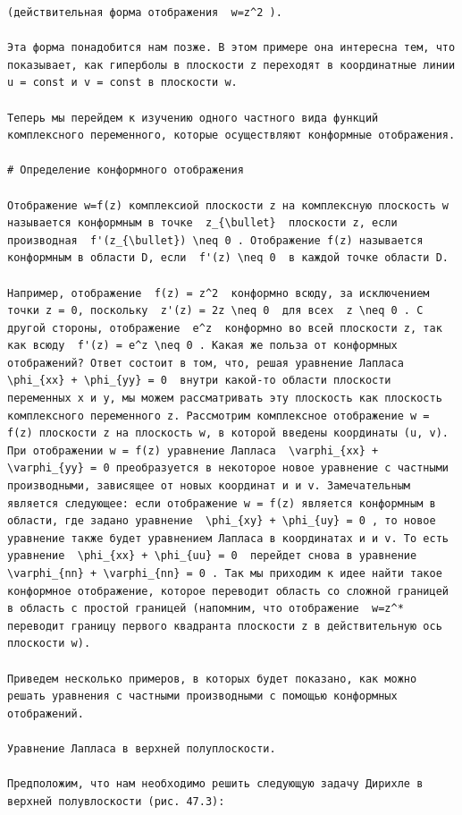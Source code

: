 \documentclass[
  ukrainian,
]{article}
\begin{document}
\begin{verbatim}
(действительная форма отображения  w=z^2 ).

Эта форма понадобится нам позже. В этом примере она интересна тем, что показывает, как гиперболы в плоскости z переходят в координатные линии u = const и v = const в плоскости w.

Теперь мы перейдем к изучению одного частного вида функций комплексного переменного, которые осуществляют конформные отображения.

# Определение конформного отображения

Отображение w=f(z) комплексиой плоскости z на комплексную плоскость w называется конформным в точке  z_{\bullet}  плоскости z, если производная  f'(z_{\bullet}) \neq 0 . Отображение f(z) называется конформным в области D, если  f'(z) \neq 0  в каждой точке области D.

Например, отображение  f(z) = z^2  конформно всюду, за исключением точки z = 0, поскольку  z'(z) = 2z \neq 0  для всех  z \neq 0 . C другой стороны, отображение  e^z  конформно во всей плоскости z, так как всюду  f'(z) = e^z \neq 0 . Какая же польза от конформных отображений? Ответ состоит в том, что, решая уравнение Лапласа  \phi_{xx} + \phi_{yy} = 0  внутри какой-то области плоскости переменных x и y, мы можем рассматривать эту плоскость как плоскость комплексного переменного z. Рассмотрим комплексное отображение w = f(z) плоскости z на плоскость w, в которой введены координаты (u, v). При отображении w = f(z) уравнение Лапласа  \varphi_{xx} + \varphi_{yy} = 0 преобразуется в некоторое новое уравнение с частными производными, зависящее от новых координат и и v. Замечательным является следующее: если отображение w = f(z) является конформным в области, где задано уравнение  \phi_{xy} + \phi_{uy} = 0 , то новое уравнение также будет уравнением Лапласа в координатах и и v. To есть уравнение  \phi_{xx} + \phi_{uu} = 0  перейдет снова в уравнение  \varphi_{nn} + \varphi_{nn} = 0 . Так мы приходим к идее найти такое конформное отображение, которое переводит область со сложной границей в область с простой границей (напомним, что отображение  w=z^*  переводит границу первого квадранта плоскости z в действительную ось плоскости w).

Приведем несколько примеров, в которых будет показано, как можно решать уравнения с частными производными с помощью конформных отображений.

Уравнение Лапласа в верхней полуплоскости.

Предположим, что нам необходимо решить следующую задачу Дирихле в верхней полувлоскости (рис. 47.3):


\end{verbatim}
\end{document}
